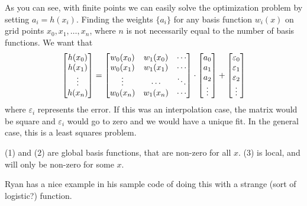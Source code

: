 \documentclass[10pt]{article}
\begin{document}
\begin{enumerate}
\begin{figure}[H]
	\end{figure}
	As you can see, with finite points we can easily solve the optimization problem by setting $a_i = h(x_i)$. Finding the weights $\{a_i\}$ for any basis function $w_i(x)$ on grid points $x_0,x_1,\dots,x_n$, where $n$ is not necessarily equal to the number of basis functions. We want that
	\[
	\begin{bmatrix}h(x_0) \\ h(x_1) \\ \vdots\\ h(x_n)\end{bmatrix} = \begin{bmatrix}w_0(x_0) & w_1(x_0) & \cdots \\ w_0(x_1) & w_1(x_1) & \cdots \\ \vdots & \cdots & \ddots \\ w_0(x_n) & w_1(x_n) & \cdots\end{bmatrix} \cdot \begin{bmatrix}a_0 \\ a_1 \\ a_2 \\ \vdots \end{bmatrix} + \begin{bmatrix}\varepsilon_0 \\ \varepsilon_1 \\ \varepsilon_2 \\ \vdots\end{bmatrix}
	\]
	where $\varepsilon_i$ represents the error. If this was an interpolation case, the matrix would be square and $\varepsilon_i$ would go to zero and we would have a unique fit. In the general case, this is a least squares problem.
\end{enumerate}

\bigskip

\begin{remark}
	(1) and (2) are global basis functions, that are non-zero for all $x$. (3) is local, and will only be non-zero for some $x$.
\end{remark}
\begin{remark}
	Ryan has a nice example in his sample code of doing this with a strange (sort of logistic?) function. 
\end{remark}
\end{document}
